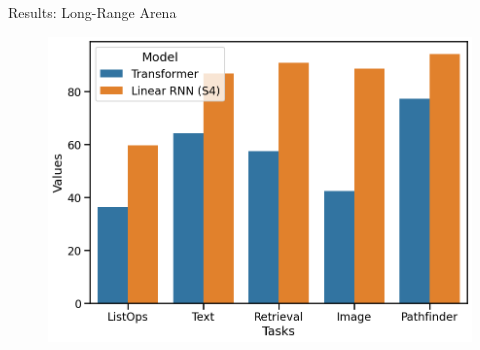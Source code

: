 \begin{frame}[c]{Results: Long-Range Arena \cite{gu2022parameterization}}
    \centering
    \begin{figure}
        \centering
        \includegraphics[height=0.8\textheight,clip,trim={0.1cm 0.1cm 0.1cm 0.1cm}]{Figs/lra-s4.png}
        \label{fig:my_label}
    \end{figure}
\end{frame}






    
 

